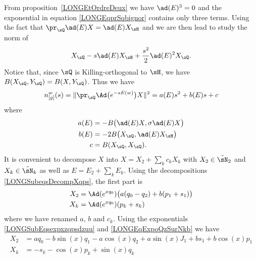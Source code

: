%
From proposition~\ref{LONGEtOrdreDeux} we have $\ad(E)^3=0$ and the exponential in equation \eqref{LONGEqprSqbignor} contains only three terms. Using the fact that $\pr_{\sQ}\ad(E)X=\ad(E)X_{\sH}$ and  we are then lead to study the norm of
\begin{equation}
	X_{\sQ}-s\ad(E)X_{\sH}+\frac{ s^2 }{2}\ad(E)^2X_{\sQ}.
\end{equation}
Notice that, since $\sQ$ is Killing-orthogonal to $\sH$, we have $B(X_{\sQ},Y_{\sQ})=B(X,Y_{\sQ})$. Thus we have
\begin{equation}
	n_{[g]}^w(s)=\|   \pr_{\sQ} \Ad\big(  e^{-s E(w)} \big)X  \|^2=a(E)s^2+b(E)s+c
\end{equation}
where
\begin{subequations}        \label{LONGSubEqsabcEBBB}
	\begin{align}
		a(E) & =-B\big( \ad(E)X,\sigma\ad(E)X \big)        \label{LONGEqCoefaEBX} \\
		b(E) & =-2B\big( X_{\sQ},\ad(E)X_{\sH} \big)                              \\
		c    & =B(X_{\sQ},X_{\sQ}).
	\end{align}
\end{subequations}
%
%
It is convenient to decompose $X$ into $X=X_2+\sum_kc_kX_k$ with $X_2\in\tilde\sN_2$ and $X_k\in\tilde\sN_k$ as well as $E=E_2+\sum_kE_k$. Using the decompositions \eqref{LONGSubeqsDecompXqps}, the first part is
\begin{equation}
	\begin{aligned}[]
		X_2 & =\Ad( e^{xq_0})\big( a(q_0-q_2)+b(p_1+s_1) \big)    \label{LONGEqXsiAdSTrois} \\
		X_k & =\Ad( e^{xq_0})(p_k+s_k)
	\end{aligned}
\end{equation}
%
where we have renamed $a$, $b$ and $c_k$. Using the exponentials \eqref{LONGSubEqsexpxzqpsdzuu} and \eqref{LONGEqExpoQzSurNkb} we have
\begin{subequations}
	\begin{align}
		X_2 & = aq_0-b\sin(x)q_1-a\cos(x)q_2 +a\sin(x)J_1+b s_1+b\cos(x)p_1    \label{LONGsubEqXtroisdonne} \\
		X_k & = -s_k-\cos(x)p_k+\sin(x)q_k                    \label{LONGsubEqXkdonne}
	\end{align}
\end{subequations}

